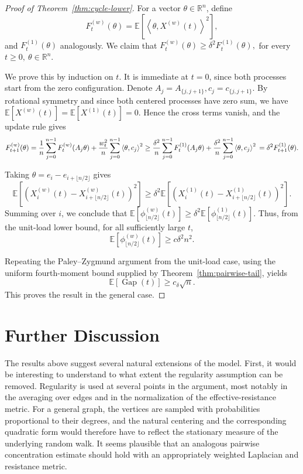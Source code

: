 \documentclass[11pt]{article}
\numberwithin{equation}{section}
\newcommand{\R}{\mathbb{R}}
\newcommand{\E}{\mathbb{E}}
\newcommand{\1}{\mathbf{1}}
\newcommand{\ip}[2]{\left\langle #1,#2\right\rangle}
\newcommand{\Gap}{\operatorname{Gap}}
\begin{document}
\begin{proof}[Proof of Theorem~\ref{thm:cycle-lower}]
For a vector \(\theta \in \R^n\), define
\[
F_t^{(w)}(\theta)
=
\E\left[ \ip{\theta}{X^{(w)}(t)} ^2
\right],
\]
and \(F_t^{(1)}(\theta)\) analogously. We claim that \(
F_t^{(w)}(\theta)
\ge
\delta^2 F_t^{(1)}(\theta),
\) for every \(t \ge 0, \ \theta \in \R^n\).


We prove this by induction on \(t\). It is immediate at \(t=0\), since both processes start from the zero configuration. 
Denote $A_j = A_{\{j,j+1\} } , c_j = c_{\{j,j+1\}}$.
By rotational symmetry and since both centered processes have zero sum, we have \(\E[X^{(w)}(t)]=\E[X^{(1)}(t)]=0\). Hence the cross terms vanish, and the update rule gives
\[
F_{t+1}^{(w)}(\theta)
=
\frac{1}{n}\sum_{j=0}^{n-1}
F_t^{(w)}(A_j\theta)
+
\frac{w_t^2}{n}
\sum_{j=0}^{n-1}
\ip{\theta}{c_j}^2 \ge \frac{\delta^2}{n}
\sum_{j=0}^{n-1}
F_t^{(1)}(A_j\theta)
+
\frac{\delta^2}{n}
\sum_{j=0}^{n-1}
\ip{\theta}{c_j}^2 \\
=
\delta^2 F_{t+1}^{(1)}(\theta).
\]

Taking
\(
\theta = e_i-e_{i+\lfloor n/2\rfloor}
\)
gives
\[
\E\left[
\left(
X_i^{(w)}(t)-X_{i+\lfloor n/2\rfloor}^{(w)}(t)
\right)^2
\right]
\ge
\delta^2
\E\left[
\left(
X_i^{(1)}(t)-X_{i+\lfloor n/2\rfloor}^{(1)}(t)
\right)^2
\right].
\]
Summing over \(i\), we conclude that
\(
\E\left[
\phi_{\lfloor n/2\rfloor}^{(w)}(t)
\right]
\ge
\delta^2
\E\left[
\phi_{\lfloor n/2\rfloor}^{(1)}(t)
\right].
\)
Thus, from the unit-load lower bound, for all sufficiently large \(t\),
\[
\E\left[
\phi_{\lfloor n/2\rfloor}^{(w)}(t)
\right]
\ge
c\delta^2 n^2.
\]

Repeating the Paley--Zygmund argument from the unit-load case, using the uniform fourth-moment bound supplied by Theorem~\ref{thm:pairwise-tail}, yields
\[
\E[\Gap(t)]
\ge
c_\delta \sqrt{n}.
\]
This proves the result in the general case. 
\end{proof}

\section{Further Discussion}
The results above suggest several natural extensions of the model. First, it would be interesting to understand to what extent the regularity assumption can be removed. Regularity is used at several points in the argument, most notably in the averaging over edges and in the normalization of the effective-resistance metric. For a general graph, the vertices are sampled with probabilities proportional to their degrees, and the natural centering and the corresponding quadratic form would therefore have to reflect the stationary measure of the underlying random walk. It seems plausible that an analogous pairwise concentration estimate should hold with an appropriately weighted Laplacian and resistance metric.
\end{document}
